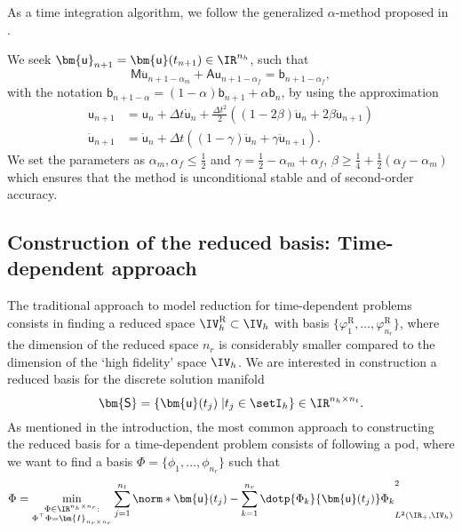 As a time integration algorithm, we follow the generalized $\alpha$-method proposed in \cite{chungTimeIntegrationAlgorithm1993}.
\begin{problem} \label{pr:dp}
We seek $\bm{\mathsf{u}}_{n+1} = \bm{\mathsf{u}}(t_{n+1}) \in \IR^{n_h}$, such that
\begin{equation}
    \bm{\mathsf{M}} \ddot{\bm{\mathsf{u}}}_{n+1-\alpha_{m}} + \bm{\mathsf{A}} \bm{\mathsf{u}}_{n+1-\alpha_{f}} = \bm{\mathsf{b}}_{n+1-\alpha_{f}},
\end{equation}
with the notation $\bm{\mathsf{b}}_{n+1-\alpha} = (1-\alpha) \bm{\mathsf{b}}_{n+1} + \alpha \bm{\mathsf{b}}_{n}$, by using the approximation
\begin{align}
    \bm{\mathsf{u}}_{n+1} &= \bm{\mathsf{u}}_n + \Delta t \dot{\bm{\mathsf{u}}}_n + \frac{\Delta t^2}{2} \left( (1-2\beta) \ddot{\bm{\mathsf{u}}}_n + 2 \beta \ddot{\bm{\mathsf{u}}}_{n+1} \right) \\
    \dot{\bm{\mathsf{u}}}_{n+1} &= \dot{\bm{\mathsf{u}}}_{n} + \Delta t \left( (1-\gamma) \ddot{\bm{\mathsf{u}}}_n +\gamma \ddot{\bm{\mathsf{u}}}_{n+1} \right).
\end{align}
We set the parameters as $\alpha_m, \alpha_f \leq \frac{1}{2}$ and $\gamma = \frac{1}{2} - \alpha_m + \alpha_f$, $\beta \geq \frac{1}{4} + \frac{1}{2} (\alpha_f-\alpha_m)$ which ensures that the method is unconditional stable and of second-order accuracy.
\end{problem}

\subsection{Construction of the reduced basis: Time-dependent approach}

The traditional approach to model reduction for time-dependent problems consists in finding a reduced space $\IV_h^{\textrm{R}}\subset\IV_h$ with basis $\{\varphi_1^\textrm{R},\dots,\varphi_{n_r}^\textrm{R}\}$, where the dimension of the reduced space $n_r$ is considerably smaller compared to the dimension of the `high fidelity' space $\IV_h$. We are interested in construction a reduced basis for the discrete solution manifold
\begin{equation} \label{eq:tsnap}
    \bm{\mathsf{S}} = \{ \bm{\mathsf{u}}(t_j) \; | t_j \in \setI_h \} \in \IR^{n_h \times n_t}.
\end{equation}
As mentioned in the introduction, the most common approach to constructing the reduced basis for a time-dependent problem consists of following a \gls{pod}, where we want to find a basis $\Phi = \{\phi_1,\ldots,\phi_{n_r}\}$ such that
\begin{equation} \label{eq:tPOD}
	\Phi = \min_{\substack{\Phi \in \IR^{n_h \times n_r}: \\ \Phi^{\top} \Phi = \bm{I}_{n_r \times n_r}}}
    	\sum_{j=1}^{n_t} \norm*{\bm{\mathsf{u}}(t_j) - \sum_{k=1}^{n_r} \dotp{\Phi_k}{\bm{\mathsf{u}}(t_j)} \Phi_k
	}^2_{L^2(\IR_+,\IV_h)}
\end{equation}

